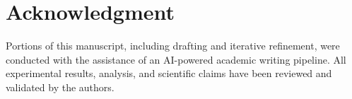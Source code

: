 \documentclass[journal]{IEEEtran}
\theoremstyle{plain}
\theoremstyle{definition}
\theoremstyle{remark}
\begin{document}
\section*{Acknowledgment}
\noindent Portions of this manuscript, including drafting and iterative refinement, were conducted with the assistance of an AI-powered academic writing pipeline. All experimental results, analysis, and scientific claims have been reviewed and validated by the authors.

\balance


\end{document}
